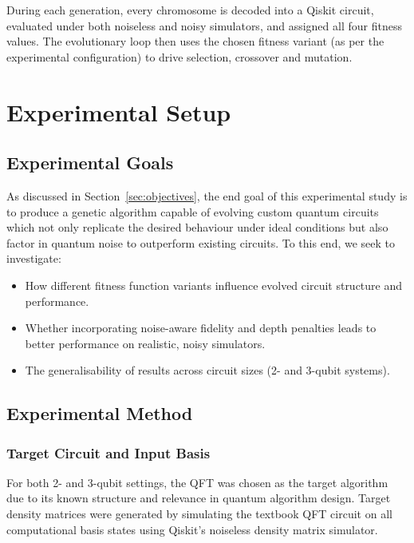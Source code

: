 \documentclass[11pt,a4paper]{article}
\begin{document}
During each generation, every chromosome is decoded into a Qiskit circuit, evaluated under both noiseless and noisy simulators, and assigned all four fitness values.  The evolutionary loop then uses the chosen fitness variant (as per the experimental configuration) to drive selection, crossover and mutation.

%
%
\section{Experimental Setup} \label{sec:experimental}
\subsection{Experimental Goals}
As discussed in Section~\ref{sec:objectives}, the end goal of this experimental study is to produce a genetic algorithm capable of evolving custom quantum circuits which not only replicate the desired behaviour under ideal conditions but also factor in quantum noise to outperform existing circuits. To this end, we seek to investigate:
\begin{itemize}
    \item How different fitness function variants influence evolved circuit structure and performance.
    \item Whether incorporating noise-aware fidelity and depth penalties leads to better performance on realistic, noisy simulators.
    \item The generalisability of results across circuit sizes (2- and 3-qubit systems).
\end{itemize}

\subsection{Experimental Method}
\subsubsection*{Target Circuit and Input Basis}
For both 2- and 3-qubit settings, the QFT was chosen as the target algorithm due to its known structure and relevance in quantum algorithm design. Target density matrices were generated by simulating the textbook QFT circuit on all computational basis states using Qiskit's noiseless density matrix simulator.
\end{document}
